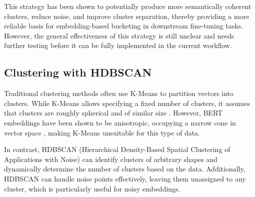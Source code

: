 \documentclass[twocolumn]{article}
\newcounter{ex}
\renewcommand{\indent}{\hspace*{2em}}
\begin{document}
This strategy has been shown to potentially produce more semantically coherent clusters, reduce noise, and improve cluster separation, thereby providing a more reliable basis for embedding-based bucketing in downstream fine-tuning tasks. However, the general effectiveness of this strategy is still unclear and needs further testing before it can be fully implemented in the current workflow. 

\subsection{Clustering with HDBSCAN}\label{clusteringwithhdbscan}
\indent Traditional clustering methods often use K-Means to partition vectors into clusters. While K-Means allows specifying a fixed number of clusters, it assumes that clusters are roughly spherical and of similar size \cite{IKOTUN2023178}. However, BERT embeddings have been shown to be anisotropic, occupying a narrow cone in vector space \cite{ethayarajh-2019-contextual}, making K-Means unsuitable for this type of data. 

\indent In contrast, HDBSCAN (Hierarchical Density-Based Spatial Clustering of Applications with Noise) \cite{10.1007/978-3-642-37456-2_14} can identify clusters of arbitrary shapes and dynamically determine the number of clusters based on the data. Additionally, HDBSCAN can handle noise points effectively, leaving them unassigned to any cluster, which is particularly useful for noisy embeddings.
\end{document}
